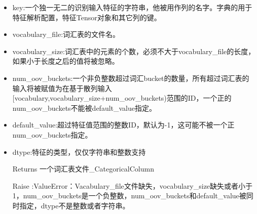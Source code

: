 \begin{itemize}
	\item key:一个独一无二的识别输入特征的字符串，他被用作列的名字。字典的用于特征解析配置，特征Tensor对象和其它列的键。
	\item vocabulary\_file:词汇表的文件名。
	\item vocabulary\_size:词汇表中的元素的个数，必须不大于vocabulary\_file的长度，如果小于长度之后的值将被忽略。
	\item num\_oov\_buckets:一个非负整数超过词汇bucket的数量，所有超过词汇表的输入将被赋值为在基于散列输入[vocabulary,vocabulary\_size+num\_oov\_buckets)范围的ID，一个正的num\_oov\_buckets不能被default\_value指定。
	\item default\_value:超过特征值范围的整数ID，默认为-1，这可能不被一个正num\_oov\_buckets指定。
	\item dtype:特征的类型，仅仅字符串和整数支持
	\item[Returns]一个词汇表文件\_CategoricalColumn
	\item[Raise]:ValueError：Vacabulary\_file文件缺失，vocabulary\_size缺失或者小于1，num\_oov\_buckets是一个负整数，num\_oov\_buckets和default\_value被同时指定，dtype不是整数或者字符串。
\end{itemize}
